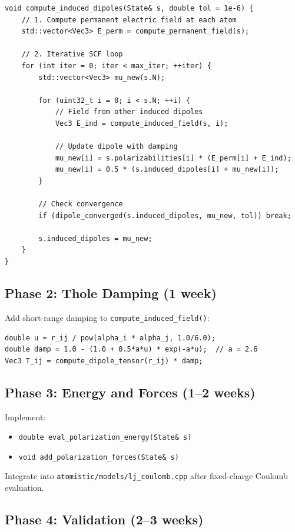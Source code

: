 \documentclass[11pt,letterpaper]{article}
\begin{document}
\begin{verbatim}
void compute_induced_dipoles(State& s, double tol = 1e-6) {
    // 1. Compute permanent electric field at each atom
    std::vector<Vec3> E_perm = compute_permanent_field(s);
    
    // 2. Iterative SCF loop
    for (int iter = 0; iter < max_iter; ++iter) {
        std::vector<Vec3> mu_new(s.N);
        
        for (uint32_t i = 0; i < s.N; ++i) {
            // Field from other induced dipoles
            Vec3 E_ind = compute_induced_field(s, i);
            
            // Update dipole with damping
            mu_new[i] = s.polarizabilities[i] * (E_perm[i] + E_ind);
            mu_new[i] = 0.5 * (s.induced_dipoles[i] + mu_new[i]);
        }
        
        // Check convergence
        if (dipole_converged(s.induced_dipoles, mu_new, tol)) break;
        
        s.induced_dipoles = mu_new;
    }
}
\end{verbatim}

\subsection{Phase 2: Thole Damping (1 week)}

Add short-range damping to \texttt{compute\_induced\_field()}:
\begin{verbatim}
double u = r_ij / pow(alpha_i * alpha_j, 1.0/6.0);
double damp = 1.0 - (1.0 + 0.5*a*u) * exp(-a*u);  // a = 2.6
Vec3 T_ij = compute_dipole_tensor(r_ij) * damp;
\end{verbatim}

\subsection{Phase 3: Energy and Forces (1--2 weeks)}

Implement:
\begin{itemize}
    \item \texttt{double eval\_polarization\_energy(State\& s)}
    \item \texttt{void add\_polarization\_forces(State\& s)}
\end{itemize}

Integrate into \texttt{atomistic/models/lj\_coulomb.cpp} after fixed-charge Coulomb evaluation.

\subsection{Phase 4: Validation (2--3 weeks)}
\end{document}
